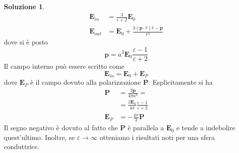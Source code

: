 \documentclass[a4paper,11pt]{book}
\renewcommand{\vec}[1]{\mathbf{#1}}
\theoremstyle{theorem}
\theoremstyle{definition}
\newtheorem{soluzione}{Soluzione}[section]
\begin{document}
\begin{soluzione}
\begin{align*}
		\vec{E}_{in}&=\frac{3}{\varepsilon+2}\vec{E}_0\\\vec{E}_{out}&=\vec{E}_0+\frac{3(\vec{p}\cdot\hat{r})\hat{r}-\vec{p}}{r^3}
	\end{align*}
	dove si è posto
	\[\vec{p}=a^3\vec{E}_0\frac{\varepsilon-1}{\varepsilon+2}\]
	Il campo interno può essere scritto come
	\[\vec{E}_{in}=\vec{E}_0+\vec{E}_P\]
	dove $\vec{E}_P$ è il campo dovuto alla polarizzazione $\vec{P}$. Esplicitamente si ha
	\begin{align*}
		\vec{P}&=\frac{3\vec{p}}{4\pi a^3}=\\&=\frac{3\vec{E}_0}{4\pi}\frac{\varepsilon-1}{\varepsilon+2}\\
		\vec{E}_P&=-\frac{4\pi}{3}\vec{P}
	\end{align*}
	Il segno negativo è dovuto al fatto che $\vec{P}$ è parallela a $\vec{E}_0$ e tende a indebolire quest'ultimo. Inoltre, se $\varepsilon\to\infty$ otteniamo i risultati noti per una sfera conduttrice.
\end{soluzione}
\end{document}
